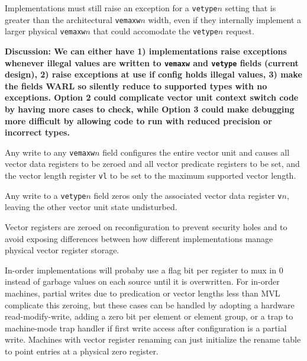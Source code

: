 \begin{commentary}
Implementations must still raise an exception for a {\tt vetype}$n$
setting that is greater than the architectural {\tt vemaxw}$n$ width,
even if they internally implement a larger physical {\tt vemaxw}$n$
that could accomodate the {\tt vetype}$n$ request.

{\bf Discussion: We can either have 1) implementations raise
  exceptions whenever illegal values are written to {\tt vemaxw} and
  {\tt vetype} fields (current design), 2) raise exceptions at use if
  config holds illegal values, 3) make the fields WARL so silently
  reduce to supported types with no exceptions.  Option 2 could
  complicate vector unit context switch code by having more cases to
  check, while Option 3 could make debugging more difficult by
  allowing code to run with reduced precision or incorrect types.}
\end{commentary}

Any write to any {\tt vemaxw}$n$ field configures the entire
vector unit and causes all vector data registers to be zeroed and all
vector predicate registers to be set, and the vector length register
{\tt vl} to be set to the maximum supported vector length.

Any write to a {\tt vetype}$n$ field zeros only the
associated vector data register {\tt v}$n$, leaving the other vector
unit state undisturbed.

\begin{commentary}
  Vector registers are zeroed on reconfiguration to prevent security
  holes and to avoid exposing differences between how different
  implementations manage physical vector register storage.

  In-order implementations will probaby use a flag bit per register to
  mux in 0 instead of garbage values on each source until it is
  overwritten.  For in-order machines, partial writes due to
  predication or vector lengths less than MVL complicate this zeroing,
  but these cases can be handled by adopting a hardware
  read-modify-write, adding a zero bit per element or element group,
  or a trap to machine-mode trap handler if first write access after
  configuration is a partial write.  Machines with vector register
  renaming can just initialize the rename table to point entries at a
  physical zero register.
\end{commentary}


